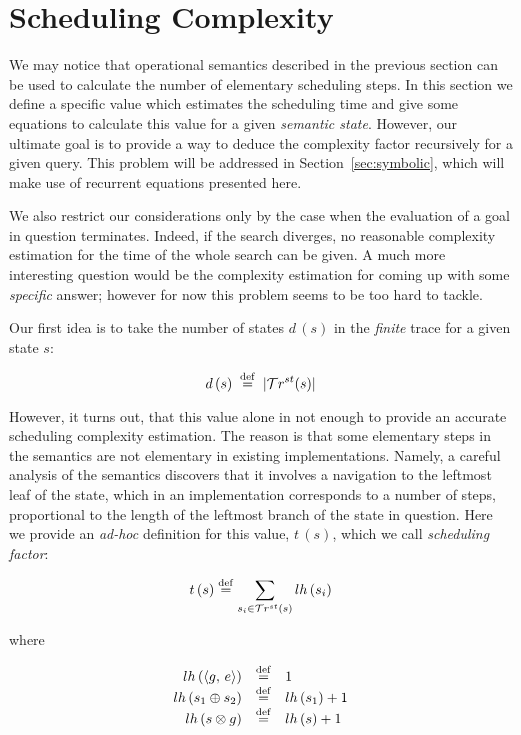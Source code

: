 \section{Scheduling Complexity}
\label{sec:scheduling}

We may notice that operational semantics described in the previous section can be used to calculate the number of elementary scheduling steps.
In this section we define a specific value which estimates the scheduling time and give some equations to calculate this value for a given \emph{semantic
state}. However, our ultimate goal is to provide a way to deduce the complexity factor recursively for a given query. This problem will be addressed in
Section~\ref{sec:symbolic}, which will make use of recurrent equations presented here.

We also restrict our considerations only by the case when the evaluation of a goal in question terminates. Indeed,
if the search diverges, no reasonable complexity estimation for the time of the whole search can be given. A much more interesting question would be
the complexity estimation for coming up with some \emph{specific} answer; however for now this problem seems to be too hard to
tackle.

Our first idea is to take the number of states $d\,(s)$ in the \emph{finite} trace for a given state $s$:

\[ d\,(s) \; \overset{\mathrm{def}}{=} \; | \mathcal{T}r^{st}(s) |  \]

However, it turns out, that this value alone in not enough to provide an accurate scheduling complexity estimation. The reason is that some
elementary steps in the semantics are not elementary in existing implementations. Namely, a careful analysis of the semantics discovers that
it involves a navigation to the leftmost leaf of the state, which in an implementation corresponds to a number of
steps, proportional to the length of the leftmost branch of the state in question. Here we provide an \emph{ad-hoc} definition for this value, $t\,(s)$, which we call \emph{scheduling factor}:

\[
t\,(s) \overset{\mathrm{def}}{=} \sum\limits_{s_i \in \mathcal{T}r^{st}(s)} lh\,(s_i) 
\]

where

\[
\begin{array}{rcl}
 lh\,(\langle g ,\, e \rangle)  &\overset{\mathrm{def}}{=}& 1 \\
 lh\,(s_1 \oplus s_2) &\overset{\mathrm{def}}{=}& lh\,(s_1) + 1 \\
 lh\,(s \otimes g)    &\overset{\mathrm{def}}{=}& lh\,(s) + 1 \\
\end{array}
\]


